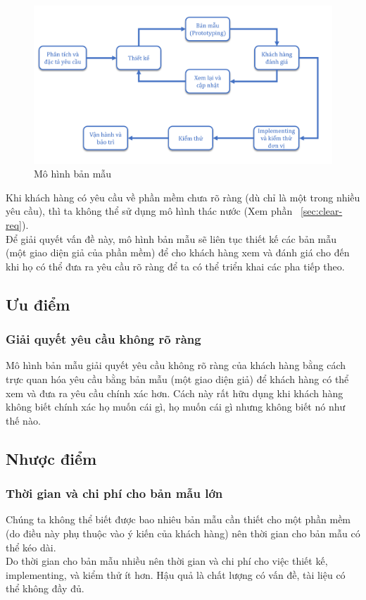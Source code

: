 \documentclass[14pt]{extarticle}
\begin{document}
\begin{figure}[h]
  \centering
  \includegraphics[width=\textwidth]{prototype.png}
  \caption{Mô hình bản mẫu}
  \label{fig:prototype-model}
\end{figure}

Khi khách hàng có yêu cầu về phần mềm chưa rõ ràng (dù chỉ là một trong
nhiều yêu cầu), thì ta không thể sử dụng mô hình thác nước (Xem phần ~\ref{sec:clear-req}).\\

Để giải quyết vấn đề này, mô hình bản mẫu sẽ liên tục thiết kế các bản mẫu
(một giao diện giả của phần mềm) để cho khách hàng xem và đánh giá cho
đến khi họ có thể đưa ra yêu cầu rõ ràng để ta có thể triển khai các pha
tiếp theo.

\subsection{Ưu điểm}
\subsubsection*{Giải quyết yêu cầu không rõ ràng}
Mô hình bản mẫu giải quyết yêu cầu không rõ ràng của khách hàng
bằng cách trực quan hóa yêu cầu bằng bản mẫu (một giao diện giả)
để khách hàng có thể xem và đưa ra yêu cầu chính xác hơn.
Cách này rất hữu dụng khi khách hàng không biết chính xác họ muốn
cái gì, họ muốn cái gì nhưng không biết nó như thế nào.

\subsection{Nhược điểm}
\subsubsection*{Thời gian và chi phí cho bản mẫu lớn}
Chúng ta không thể biết được bao nhiêu bản mẫu cần thiết cho một phần mềm (do
điều này phụ thuộc vào ý kiến của khách hàng) nên thời gian cho bản mẫu
có thể kéo dài.\\
Do thời gian cho bản mẫu nhiều nên thời gian và chi phí cho việc thiết kế,
implementing, và kiểm thử ít hơn. Hậu quả là chất lượng có vấn đề, tài liệu
có thể không đầy đủ.
\end{document}
